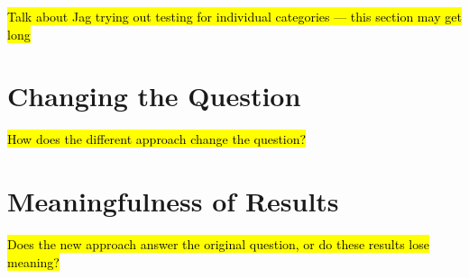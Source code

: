 \hl{Talk about Jag trying out testing for individual categories --- this section may get long}

\section{Changing the Question}

\hl{How does the different approach change the question?}

\section{Meaningfulness of Results}

\hl{Does the new approach answer the original question, or do these results lose meaning?}

